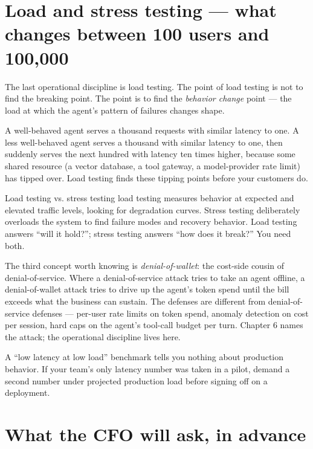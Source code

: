 \section{Load and stress testing --- what changes between 100 users and 100{,}000}

The last operational discipline is load testing. The point of load testing is not to find the breaking point. The point is to find the \textit{behavior change} point --- the load at which the agent's pattern of failures changes shape.

A well-behaved agent serves a thousand requests with similar latency to one. A less well-behaved agent serves a thousand with similar latency to one, then suddenly serves the next hundred with latency ten times higher, because some shared resource (a vector database, a tool gateway, a model-provider rate limit) has tipped over. Load testing finds these tipping points before your customers do.

\begin{TNdefinition}{Load testing vs. stress testing} load testing measures behavior at expected and elevated traffic levels, looking for degradation curves. Stress testing deliberately overloads the system to find failure modes and recovery behavior. Load testing answers ``will it hold?''; stress testing answers ``how does it break?'' You need both. \end{TNdefinition}

The third concept worth knowing is \textit{denial-of-wallet}: the cost-side cousin of denial-of-service. Where a denial-of-service attack tries to take an agent offline, a denial-of-wallet attack tries to drive up the agent's token spend until the bill exceeds what the business can sustain. The defenses are different from denial-of-service defenses --- per-user rate limits on token spend, anomaly detection on cost per session, hard caps on the agent's tool-call budget per turn. Chapter 6 names the attack; the operational discipline lives here.

\begin{TNwarning} A ``low latency at low load'' benchmark tells you nothing about production behavior. If your team's only latency number was taken in a pilot, demand a second number under projected production load before signing off on a deployment. \end{TNwarning}

\section{What the CFO will ask, in advance}

